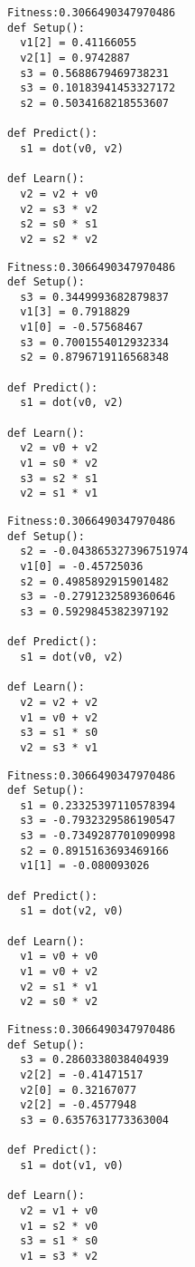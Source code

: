 \documentclass[twocolumn, a4j]{jarticle}
\begin{document}
\newpage

\begin{lstlisting}[caption= No. 5.21]
Fitness:0.3066490347970486 
def Setup():
  v1[2] = 0.41166055
  v2[1] = 0.9742887
  s3 = 0.5688679469738231
  s3 = 0.10183941453327172
  s2 = 0.5034168218553607

def Predict():
  s1 = dot(v0, v2)

def Learn():
  v2 = v2 + v0
  v2 = s3 * v2
  s2 = s0 * s1
  v2 = s2 * v2

\end{lstlisting}

\begin{lstlisting}[caption= No. 5.22]
Fitness:0.3066490347970486 
def Setup():
  s3 = 0.3449993682879837
  v1[3] = 0.7918829
  v1[0] = -0.57568467
  s3 = 0.7001554012932334
  s2 = 0.8796719116568348

def Predict():
  s1 = dot(v0, v2)

def Learn():
  v2 = v0 + v2
  v1 = s0 * v2
  s3 = s2 * s1
  v2 = s1 * v1

\end{lstlisting}

\newpage

\begin{lstlisting}[caption= No. 5.23]
Fitness:0.3066490347970486 
def Setup():
  s2 = -0.043865327396751974
  v1[0] = -0.45725036
  s2 = 0.4985892915901482
  s3 = -0.2791232589360646
  s3 = 0.5929845382397192

def Predict():
  s1 = dot(v0, v2)

def Learn():
  v2 = v2 + v2
  v1 = v0 + v2
  s3 = s1 * s0
  v2 = s3 * v1

\end{lstlisting}

\begin{lstlisting}[caption= No. 5.24]
Fitness:0.3066490347970486 
def Setup():
  s1 = 0.23325397110578394
  s3 = -0.7932329586190547
  s3 = -0.7349287701090998
  s2 = 0.8915163693469166
  v1[1] = -0.080093026

def Predict():
  s1 = dot(v2, v0)

def Learn():
  v1 = v0 + v0
  v1 = v0 + v2
  v2 = s1 * v1
  v2 = s0 * v2

\end{lstlisting}

\newpage

\begin{lstlisting}[caption= No. 5.25]
Fitness:0.3066490347970486 
def Setup():
  s3 = 0.2860338038404939
  v2[2] = -0.41471517
  v2[0] = 0.32167077
  v2[2] = -0.4577948
  s3 = 0.6357631773363004

def Predict():
  s1 = dot(v1, v0)

def Learn():
  v2 = v1 + v0
  v1 = s2 * v0
  s3 = s1 * s0
  v1 = s3 * v2

\end{lstlisting}
\end{document}
